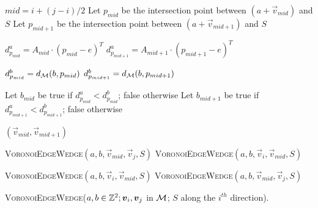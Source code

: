 \documentclass{llncs}
\begin{document}
\begin{algorithm}
\small
{
   $mid  = i + (j-i)/2$\;
   Let $p_{mid}$  be the intersection point between $(a +
   \vec{v}_{mid})$ and $S$\;
  Let $p_{mid+1}$  be the intersection point between $(a +
   \vec{v}_{mid+1})$ and $S$\;


   $d^a_{p_{mid}} = A_{mid}\cdot (p_{mid}-e)^T$\;
   $d^a_{p_{mid+1}} = A_{mid+1}\cdot (p_{mid+1}-e)^T$\;


   $d^b_{p_{mid}} = d_{\mathcal{M}}(b, p_{mid})$\;
   $d^b_{p_{mid+1}} = d_{\mathcal{M}}(b,p_{mid+1})$\;

   Let $b_{mid}$ be true if $d^a_{p_{mid}} < d^b_{p_{mid}}$; false otherwise\;
   Let $b_{mid+1}$ be true if $d^a_{p_{mid+1}} < d^b_{p_{mid+1}}$; false otherwise\;


    { \Return $(\vec{v}_{mid},\vec{v}_{mid+1})$\; }

{
{
  \Return \textsc{VoronoiEdgeWedge}$(a,b,\vec{v}_{mid}, \vec{v}_{j}, S)$\;
}
{
  \Return \textsc{VoronoiEdgeWedge}$(a,b,\vec{v}_{i}, \vec{v}_{mid}, S)$\;
}

}
{
{
  \Return \textsc{VoronoiEdgeWedge}$(a,b,\vec{v}_{i}, \vec{v}_{mid}, S)$\;
}
{
  \Return \textsc{VoronoiEdgeWedge}$(a,b,\vec{v}_{mid}, \vec{v}_{j}, S)$\;
}

}

}
  \caption{\textsc{VoronoiEdgeWedge}($a,b\in\Z^2; \vec{v}_i,\vec{v}_j$
    in $\mathcal{M}$; $S$ along the $i^{th}$ direction).\label{alg:chamedgew}}
\end{algorithm}
\end{document}
